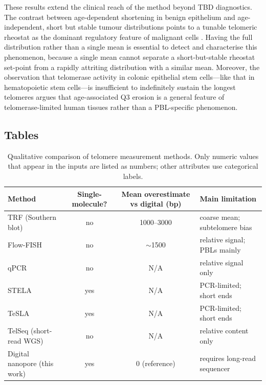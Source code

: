 \documentclass[11pt]{article}
\begin{document}
These results extend the clinical reach of the method beyond TBD
diagnostics. The contrast between age-dependent shortening in benign
epithelium and age-independent, short but stable tumour distributions
points to a tunable telomeric rheostat as the dominant regulatory
feature of malignant cells
\citep{palm2008howshelterin,hockemeyer2015control}. Having the full
distribution rather than a single mean is essential to detect and
characterise this phenomenon, because a single mean cannot separate a
short-but-stable rheostat set-point from a rapidly attriting
distribution with a similar mean. Moreover, the observation that
telomerase activity in colonic epithelial stem cells---like that in
hematopoietic stem cells---is insufficient to indefinitely sustain the
longest telomeres argues that age-associated Q3 erosion is a general
feature of telomerase-limited human tissues rather than a PBL-specific
phenomenon.

\subsection{Tables}

\begin{table}[htbp]
\centering
\caption{Qualitative comparison of telomere measurement methods. Only
numeric values that appear in the inputs are listed as numbers; other
attributes use categorical labels.}
\label{tab:methods}
\small
\begin{tabular}{lccl}
\toprule
Method & Single-molecule? & Mean overestimate vs digital (bp) & Main limitation \\
\midrule
TRF (Southern blot)        & no  & 1000--3000 & coarse mean; subtelomere bias \\
Flow-FISH                  & no  & $\sim$1500 & relative signal; PBLs mainly \\
qPCR                       & no  & N/A        & relative signal only \\
STELA                      & yes & N/A        & PCR-limited; short ends \\
TeSLA                      & yes & N/A        & PCR-limited; short ends \\
TelSeq (short-read WGS)    & no  & N/A        & relative content only \\
Digital nanopore (this work) & yes & 0 (reference) & requires long-read sequencer \\
\bottomrule
\end{tabular}
\end{table}
\end{document}

